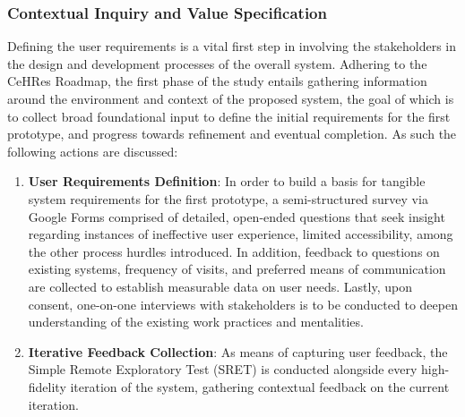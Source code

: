 \documentclass[11pt,a4paper,titlepage]{article}
\begin{document}
	\subsubsection{Contextual Inquiry and Value Specification}
	Defining the user requirements is a vital first step in involving the stakeholders in the design and development processes of the overall system. Adhering to the CeHRes Roadmap, the first phase of the study entails gathering information around the environment and context of the proposed system, the goal of which is to collect broad foundational input to define the initial requirements for the first prototype, and progress towards refinement and eventual completion. As such the following actions are discussed: 
	\begin{enumerate}
		\item \textbf{User Requirements Definition}: In order to build a basis for tangible system requirements for the first prototype, a semi-structured survey via Google Forms comprised of detailed, open-ended questions that seek insight regarding instances of ineffective user experience, limited accessibility, among the other process hurdles introduced. In addition, feedback to questions on existing systems, frequency of visits, and preferred means of communication are collected to establish measurable data on user needs. Lastly, upon consent, one-on-one interviews with stakeholders is to be conducted to deepen understanding of the existing work practices and mentalities. 
		\item \textbf{Iterative Feedback Collection}: As means of capturing user feedback, the Simple Remote Exploratory Test (SRET) is conducted alongside every high-fidelity iteration of the system, gathering contextual feedback on the current iteration. 
	\end{enumerate}
	\clearpage
\end{document}
